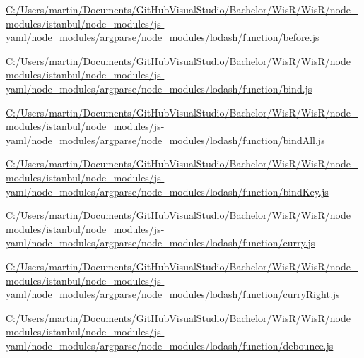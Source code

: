 \begin{DoxyCompactItemize}
\item 
\hyperlink{_c_1_2_users_2martin_2_documents_2_git_hub_visual_studio_2_bachelor_2_wis_r_2_wis_r_2node_modulea6786fe362c0e01292f7d68481d1aec0}{C\+:/\+Users/martin/\+Documents/\+Git\+Hub\+Visual\+Studio/\+Bachelor/\+Wis\+R/\+Wis\+R/node\+\_\+modules/istanbul/node\+\_\+modules/js-\/yaml/node\+\_\+modules/argparse/node\+\_\+modules/lodash/function/before.\+js}
\item 
\hyperlink{_c_1_2_users_2martin_2_documents_2_git_hub_visual_studio_2_bachelor_2_wis_r_2_wis_r_2node_modulecab4dd91fb657042147e5d27dfff3abf}{C\+:/\+Users/martin/\+Documents/\+Git\+Hub\+Visual\+Studio/\+Bachelor/\+Wis\+R/\+Wis\+R/node\+\_\+modules/istanbul/node\+\_\+modules/js-\/yaml/node\+\_\+modules/argparse/node\+\_\+modules/lodash/function/bind.\+js}
\item 
\hyperlink{_c_1_2_users_2martin_2_documents_2_git_hub_visual_studio_2_bachelor_2_wis_r_2_wis_r_2node_modulea35e634a791715917f13ee9c8f82053c}{C\+:/\+Users/martin/\+Documents/\+Git\+Hub\+Visual\+Studio/\+Bachelor/\+Wis\+R/\+Wis\+R/node\+\_\+modules/istanbul/node\+\_\+modules/js-\/yaml/node\+\_\+modules/argparse/node\+\_\+modules/lodash/function/bind\+All.\+js}
\item 
\hyperlink{_c_1_2_users_2martin_2_documents_2_git_hub_visual_studio_2_bachelor_2_wis_r_2_wis_r_2node_module92d317f73318755fc6649978a9c24b01}{C\+:/\+Users/martin/\+Documents/\+Git\+Hub\+Visual\+Studio/\+Bachelor/\+Wis\+R/\+Wis\+R/node\+\_\+modules/istanbul/node\+\_\+modules/js-\/yaml/node\+\_\+modules/argparse/node\+\_\+modules/lodash/function/bind\+Key.\+js}
\item 
\hyperlink{_c_1_2_users_2martin_2_documents_2_git_hub_visual_studio_2_bachelor_2_wis_r_2_wis_r_2node_modulef10b01c2c3a1b23766156fddf7b93eb3}{C\+:/\+Users/martin/\+Documents/\+Git\+Hub\+Visual\+Studio/\+Bachelor/\+Wis\+R/\+Wis\+R/node\+\_\+modules/istanbul/node\+\_\+modules/js-\/yaml/node\+\_\+modules/argparse/node\+\_\+modules/lodash/function/curry.\+js}
\item 
\hyperlink{_c_1_2_users_2martin_2_documents_2_git_hub_visual_studio_2_bachelor_2_wis_r_2_wis_r_2node_modulea58d96330774a8fe5741a74a7f0c0315}{C\+:/\+Users/martin/\+Documents/\+Git\+Hub\+Visual\+Studio/\+Bachelor/\+Wis\+R/\+Wis\+R/node\+\_\+modules/istanbul/node\+\_\+modules/js-\/yaml/node\+\_\+modules/argparse/node\+\_\+modules/lodash/function/curry\+Right.\+js}
\item 
\hyperlink{_c_1_2_users_2martin_2_documents_2_git_hub_visual_studio_2_bachelor_2_wis_r_2_wis_r_2node_modulefc33e0a2ba7e22734c3f333385b18d8c}{C\+:/\+Users/martin/\+Documents/\+Git\+Hub\+Visual\+Studio/\+Bachelor/\+Wis\+R/\+Wis\+R/node\+\_\+modules/istanbul/node\+\_\+modules/js-\/yaml/node\+\_\+modules/argparse/node\+\_\+modules/lodash/function/debounce.\+js}

\end{DoxyCompactItemize}
